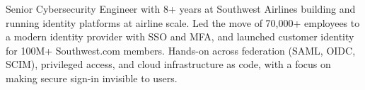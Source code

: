 \begin{cvsummary}
Senior Cybersecurity Engineer with 8+ years at Southwest Airlines building and running identity platforms at airline scale. Led the move of 70,000+ employees to a modern identity provider with SSO and MFA, and launched customer identity for 100M+ Southwest.com members. Hands-on across federation (SAML, OIDC, SCIM), privileged access, and cloud infrastructure as code, with a focus on making secure sign-in invisible to users.
\end{cvsummary}
